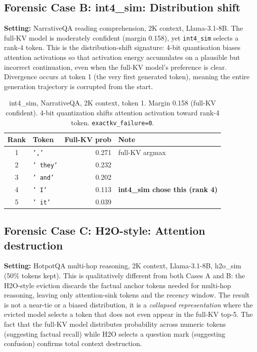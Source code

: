 \documentclass[11pt]{article}
\begin{document}
\subsection{Forensic Case B: int4\_sim: Distribution shift}

\textbf{Setting:} NarrativeQA reading comprehension, 2K context, Llama-3.1-8B. The
full-KV model is moderately confident (margin 0.158), yet \texttt{int4\_sim} selects a
rank-4 token. This is the distribution-shift signature: 4-bit quantisation biases
attention activations so that activation energy accumulates on a plausible but incorrect
continuation, even when the full-KV model's preference is clear. Divergence occurs at
token 1 (the very first generated token), meaning the entire generation trajectory is
corrupted from the start.

\begin{table}[H]
\centering\small
\begin{tabular}{clrl}
\toprule
\textbf{Rank} & \textbf{Token} & \textbf{Full-KV prob} & \textbf{Note} \\
\midrule
1 & \texttt{','} & 0.271 & full-KV argmax \\
2 & \texttt{' they'} & 0.232 & \\
3 & \texttt{' and'} & 0.202 & \\
4 & \texttt{' I'} & 0.113 & \textbf{int4\_sim chose this (rank 4)} \\
5 & \texttt{' it'} & 0.039 & \\
\bottomrule
\end{tabular}
\caption{int4\_sim, NarrativeQA, 2K context, token 1. Margin 0.158 (full-KV confident).
4-bit quantization shifts attention activation toward rank-4 token.
\texttt{exactkv\_failure=0}.}
\end{table}

\subsection{Forensic Case C: H2O-style: Attention destruction}

\textbf{Setting:} HotpotQA multi-hop reasoning, 2K context, Llama-3.1-8B, h2o\_sim
(50\% tokens kept). This is qualitatively different from both Cases A and B: the
H2O-style eviction discards the factual anchor tokens needed for multi-hop reasoning,
leaving only attention-sink tokens and the recency window. The result is not a near-tie
or a biased distribution, it is a \emph{collapsed representation} where the evicted
model selects a token that does not even appear in the full-KV top-5. The fact that the
full-KV model distributes probability across numeric tokens (suggesting factual recall)
while H2O selects a question mark (suggesting confusion) confirms total context destruction.
\end{document}
